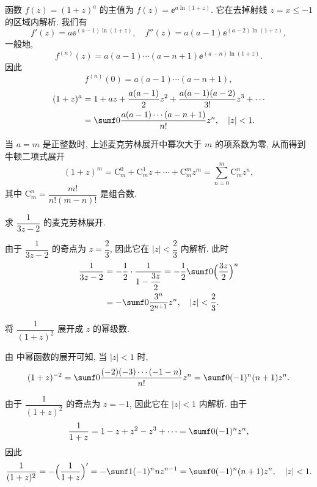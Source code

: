 \begin{example}
  \label{exam:power-taylor-series}
  函数 $f(z)=(1+z)^a$ 的主值为 $f(z)=\ee^{a\ln(1+z)}$. 它在去掉射线 $z=x\le -1$ 的区域内解析.
  我们有
  \[
    f'(z)=a \ee^{(a-1)\ln(1+z)},\quad
    f''(z)=a (a-1) \ee^{(a-2)\ln(1+z)},
  \]
  一般地,
  \[
    f^{(n)}(z)=a(a-1)\cdots(a-n+1)\ee^{(a-n)\ln(1+z)}.
  \]
  因此
  \[
    f^{(n)}(0)=a(a-1)\cdots(a-n+1),
  \]
  \begin{align*}
     (1+z)^a&
    =1+a z+\frac{a(a-1)}2z^2+\frac{a(a-1)(a-2)}{3!}z^3+\cdots\\&
    =\sumf0 \frac{a(a-1)\cdots(a-n+1)}{n!}z^n,\quad |z|<1.
  \end{align*}
\end{example}

当 $a=m$ 是正整数时, 上述麦克劳林展开中幂次大于 $m$ 的项系数为零, 从而得到牛顿二项式展开
\[
   (1+z)^m
  =\mathrm{C}_m^0+\mathrm{C}_m^1 z+\cdots+\mathrm{C}_m^m z^m
  =\sum_{n=0}^m \mathrm{C}_m^n z^n,
\]
其中 $\mathrm{C}_m^n=\dfrac{m!}{n!(m-n)!}$ 是组合数.

\begin{example}
  求 $\dfrac1{3z-2}$ 的麦克劳林展开.
\end{example}

\begin{solution}
  由于 $\dfrac1{3z-2}$ 的奇点为 $z=\dfrac23$, 因此它在 $|z|<\dfrac23$ 内解析.
  此时
  \begin{align*}
     \frac1{3z-2}&
    =-\half\cdot\frac1{1-\dfrac{3z}2}
    =-\half\sumf0 \Bigl(\frac{3z}2\Bigr)^n\\&
    =-\sumf0 \frac{3^n}{2^{n+1}}z^n,
      \quad|z|<\frac23.
  \end{align*}
\end{solution}

\begin{example}
  将 $\dfrac1{(1+z)^2}$ 展开成 $z$ 的幂级数.
\end{example}

\begin{solution}
  由 中幂函数的展开可知, 当 $|z|<1$ 时,
  \[
    (1+z)^{-2}=\sumf0 \frac{(-2)(-3)\cdots(-1-n)}{n!}z^n
    =\sumf0 (-1)^n(n+1)z^n.
  \]
\end{solution}

\begin{solution}[另解]
  由于 $\dfrac1{(1+z)^2}$ 的奇点为 $z=-1$, 因此它在 $|z|<1$ 内解析.
  由于
  \[
     \frac1{1+z}=1-z+z^2-z^3+\cdots
    =\sumf0 (-1)^nz^n,
  \]
  因此
  \[
     \frac1{(1+z)^2}
    =-\Bigl(\frac1{1+z}\Bigr)'
    =-\sumf1 (-1)^n nz^{n-1}
    =\sumf0 (-1)^n (n+1)z^n,\quad |z|<1.
  \]
\end{solution}

